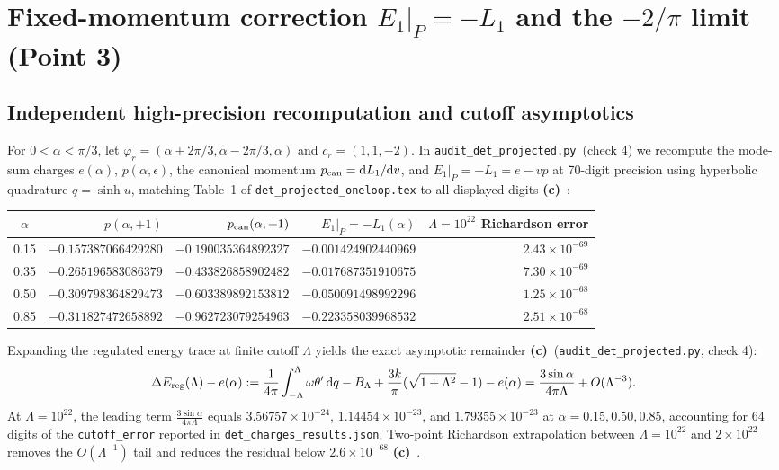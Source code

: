 \documentclass[11pt,a4paper]{article}
\newcommand{\Lc}{\textsf{\textbf{(c)}}\ }
\newcommand{\scr}{\texttt{audit\_\allowbreak det\_\allowbreak projected.py}}
\newcommand{\dd}{\mathrm d}
\begin{document}
\section{\texorpdfstring{Fixed-momentum correction $E_1|_P=-L_1$ and the $-2/\pi$ limit (Point 3)}{Fixed-momentum correction E1|P = -L1 and the -2/pi limit (Point 3)}}
\subsection{Independent high-precision recomputation and cutoff asymptotics}
For $0<\alpha<\pi/3$, let $\varphi_r=(\alpha+2\pi/3,\alpha-2\pi/3,\alpha)$ and
$c_r=(1,1,-2)$. In \scr\ (check 4) we recompute the mode-sum charges $e(\alpha)$,
$p(\alpha,\epsilon)$, the canonical momentum $p_{\rm can}=\dd L_1/\dd v$, and
$E_1|_P=-L_1=e-vp$ at 70-digit precision using hyperbolic quadrature $q=\sinh u$,
matching Table~1 of \texttt{det\_projected\_oneloop.tex} to all displayed digits \Lc:
\begin{center}\small
\begin{tabular}{@{}crrrr@{}}\toprule
$\alpha$ & $p(\alpha,+1)$ & $p_{\rm can}(\alpha,+1)$ & $E_1|_P=-L_1(\alpha)$
 & $\Lambda=10^{22}$ Richardson error\\\midrule
0.15 & $-0.157387066429280$ & $-0.190035364892327$ & $-0.001424902440969$ & $2.43\times10^{-69}$\\
0.35 & $-0.265196583086379$ & $-0.433826858902482$ & $-0.017687351910675$ & $7.30\times10^{-69}$\\
0.50 & $-0.309798364829473$ & $-0.603389892153812$ & $-0.050091498992296$ & $1.25\times10^{-68}$\\
0.85 & $-0.311827472658892$ & $-0.962723079254963$ & $-0.223358039968532$ & $2.51\times10^{-68}$\\\bottomrule
\end{tabular}
\end{center}
Expanding the regulated energy trace at finite cutoff $\Lambda$ yields the exact
asymptotic remainder \Lc (\scr, check 4):
\begin{equation}\label{eq:cutoff_asymp}
 \Delta E_{\rm reg}(\Lambda)-e(\alpha)
 := \frac1{4\pi}\int_{-\Lambda}^\Lambda\omega\theta'\,\dd q
    - B_\Lambda + \frac{3k}{\pi}(\sqrt{1+\Lambda^2}-1) - e(\alpha)
 = \frac{3\sin\alpha}{4\pi\Lambda} + O(\Lambda^{-3}).
\end{equation}
At $\Lambda=10^{22}$, the leading term $\frac{3\sin\alpha}{4\pi\Lambda}$ equals
$3.56757\times10^{-24}$, $1.14454\times10^{-23}$, and $1.79355\times10^{-23}$ at
$\alpha=0.15,0.50,0.85$, accounting for 64 digits of the \texttt{cutoff\_error}
reported in \texttt{det\_charges\_results.json}. Two-point Richardson
extrapolation between $\Lambda=10^{22}$ and $2\times10^{22}$ removes the
$O(\Lambda^{-1})$ tail and reduces the residual below $2.6\times10^{-68}$ \Lc.
\end{document}
